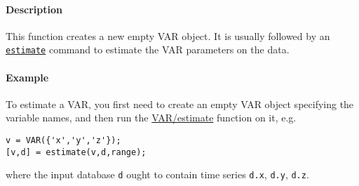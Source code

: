 \paragraph{Description}\label{description}

This function creates a new empty VAR object. It is usually followed by
an \href{VAR/estimate}{\texttt{estimate}} command to estimate the VAR
parameters on the data.

\paragraph{Example}\label{example}

To estimate a VAR, you first need to create an empty VAR object
specifying the variable names, and then run the \url{VAR/estimate}
function on it, e.g.

\begin{verbatim}
v = VAR({'x','y','z'});
[v,d] = estimate(v,d,range);
\end{verbatim}

where the input database \texttt{d} ought to contain time series
\texttt{d.x}, \texttt{d.y}, \texttt{d.z}.


